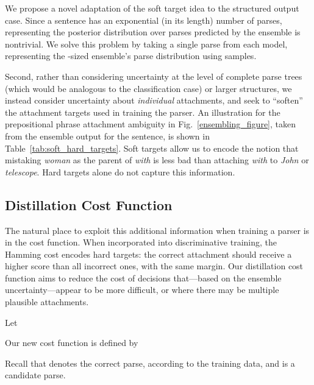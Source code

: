 \documentclass[11pt,letterpaper]{article}
\begin{document}
We propose a novel adaptation of the soft target idea to the structured output case. Since a sentence has an exponential (in its length) number of parses, representing the posterior distribution over parses predicted by the ensemble is nontrivial. We solve this problem by taking a single parse from each model, representing the -sized ensemble's parse distribution using  samples.

Second, rather than considering uncertainty at the level of complete parse trees (which would be analogous to the classification case) or larger structures, we instead consider uncertainty about \emph{individual} attachments, and seek to ``soften'' the attachment targets used in training the parser. An illustration for the prepositional phrase attachment ambiguity in Fig.~\ref{ensembling_figure}, taken from the ensemble output for the sentence, is shown in Table~\ref{tab:soft_hard_targets}. Soft targets allow us to encode the notion that mistaking \emph{woman} as the parent of \emph{with} is less bad than attaching \emph{with} to \emph{John} or \emph{telescope}.  Hard targets alone do not capture this information.



\subsection{Distillation Cost Function} \label{sec:distillation-cost}

The natural place to exploit this additional information when training a parser is in the cost function. When incorporated into discriminative training, the Hamming cost encodes hard targets:  the correct attachment should receive
a higher score than all incorrect ones, with the same margin.  Our distillation cost function aims to reduce the cost of decisions
that---based on the ensemble uncertainty---appear to be more difficult, or where there may be multiple plausible attachments.

Let 

Our new cost function is defined by 


Recall that  denotes the correct parse, according to the training data, and  is a candidate parse.
\end{document}
